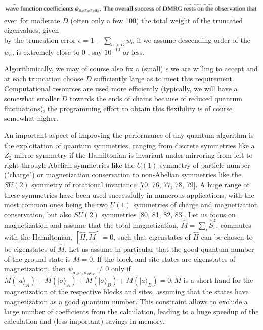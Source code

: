 \documentclass[12pt]{article}
\begin{document}
\includegraphics[max width=\textwidth, center]{2024_05_04_afc4ad226da9ccfe0ac8g-008}\\
even for moderate $D$ (often only a few 100) the total weight of the truncated eigenvalues, given\\
by the truncation error $\epsilon=1-\sum_{a>D} w_{a}$ if we assume descending order of the $w_{a}$, is extremely close to 0 , say $10^{-10}$ or less.

Algorithmically, we may of course also fix a (small) $\epsilon$ we are willing to accept and at each truncation choose $D$ sufficiently large as to meet this requirement. Computational resources are used more efficiently (typically, we will have a somewhat smaller $D$ towards the ends of chains because of reduced quantum fluctuations), the programming effort to obtain this flexibility is of course somewhat higher.

An important aspect of improving the performance of any quantum algorithm is the exploitation of quantum symmetries, ranging from discrete symmetries like a $Z_{2}$ mirror symmetry if the Hamiltonian is invariant under mirroring from left to right through Abelian symmetries like the $U(1)$ symmetry of particle number ("charge") or magnetization conservation to non-Abelian symmetries like the $S U(2)$ symmetry of rotational invariance [70, 76, 77, 78, 79]. A huge range of these symmetries have been used successfully in numerous applications, with the most common ones being the two $U(1)$ symmetries of charge and magnetization conservation, but also $S U(2)$ symmetries [80, 81, 82, 83]. Let us focus on magnetization and assume that the total magnetization, $\hat{M}=\sum_{i} \hat{S}_{i}^{z}$, commutes with the Hamiltonian, $[\hat{H}, \hat{M}]=0$, such that eigenstates of $\hat{H}$ can be chosen to be eigenstates of $\hat{M}$. Let us assume in particular that the good quantum number of the ground state is $M=0$. If the block and site states are eigenstates of magnetization, then $\psi_{a_{A} \sigma_{A} \sigma_{B} a_{B}} \neq 0$ only if $M\left(|a\rangle_{A}\right)+M\left(|\sigma\rangle_{A}\right)+M\left(|\sigma\rangle_{B}\right)+M\left(|a\rangle_{B}\right)=0 ; M$ is a short-hand for the magnetization of the respective blocks and sites, assuming that the states have magnetization as a good quantum number. This constraint allows to exclude a large number of coefficients from the calculation, leading to a huge speedup of the calculation and (less important) savings in memory.
\end{document}
